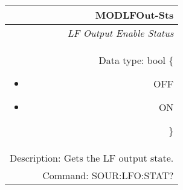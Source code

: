 \documentclass[openany]{article}
\begin{document}
		\begin{tabular}{N}
			\hline
			\bfseries MODLFOut-Sts \\ \hline
			\emph{LF Output Enable Status} \\
			Data type: bool \{\begin{itemize}[noitemsep]
				\small
				\item[] OFF
				\item[] ON
			\end{itemize}\} \\
			Description: Gets the LF output state. \\
			Command: SOUR:LFO:STAT? \\
			
		\end{tabular}
%
\end{document}
